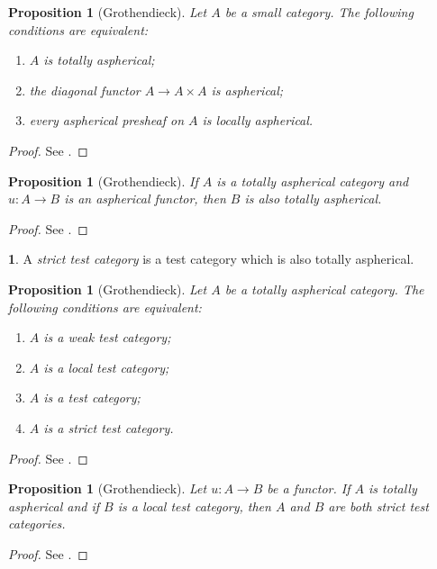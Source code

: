 \documentclass[10pt, english, a4paper, nothms]{amsart}
\theoremstyle{plain}
\newtheorem{prop}[theorem]{Proposition}
\theoremstyle{remark}
\theoremstyle{definition}
\newtheorem{paragr}[theorem]{}
\numberwithin{equation}{theorem}
\begin{document}
\begin{prop}[Grothendieck]\label{prop:totalementAspheriqueEquivalences}
Let $A$ be a small category. The following conditions are equivalent: 
\begin{enumerate}
\item $A$ is totally aspherical;
\item the diagonal functor $A \to A \times A$ is aspherical;
\item every aspherical presheaf on $A$ is locally aspherical.
\end{enumerate}
\end{prop}
\begin{proof}
See \cite[Proposition 1.6.1]{maltsiniotis2005}.
\end{proof}

\begin{prop}[Grothendieck]\label{totAspheriqueMorphismeAspherique}
If $A$ is a totally aspherical category and $u: A \to B$ is an aspherical
functor, then $B$ is also totally aspherical.
\end{prop}
\begin{proof}
See \cite[Proposition 1.6.5]{maltsiniotis2005}.
\end{proof}

\begin{paragr}
A \emph{strict test category} is a test category which is also totally
aspherical.
\end{paragr}

\begin{prop}[Grothendieck]
Let $A$ be a totally aspherical category. The following conditions are
equivalent: 
\begin{enumerate}
\item $A$ is a weak test category;
\item $A$ is a local test category;
\item $A$ is a test category;
\item $A$ is a strict test category.
\end{enumerate}
\end{prop}
\begin{proof}
See \cite[Proposition 1.6.6]{maltsiniotis2005}.
\end{proof}

\begin{prop}[Grothendieck]\label{propFonctAspheriqueSourceTotAsphTest}
Let $u: A \to B$ be a functor. If $A$ is totally aspherical and if $B$
is a local test category, then $A$ and $B$ are both strict test
categories.
\end{prop}
\begin{proof}
See \cite[Corollary 1.6.11]{maltsiniotis2005}.
\end{proof}
\end{document}
